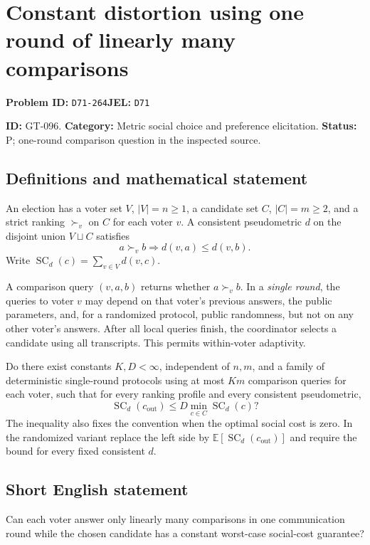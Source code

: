 \documentclass[11pt,a4paper]{article}
\begin{document}
\section*{Constant distortion using one round of linearly many comparisons}
\textbf{Problem ID:} \texttt{D71-264}\quad \textbf{JEL:} \texttt{D71}\par
\label{problem:OP-0226}
\label{game:GT-096}
{\sffamily\small\color{muted}
\noindent\textbf{ID:} GT-096. \textbf{Category:} Metric social choice and preference elicitation.
\textbf{Status:} P; one-round comparison question in the inspected source.
\par}
\subsection*{Definitions and mathematical statement}
An election has a voter set $V$, $|V|=n\geq1$, a candidate set $C$, $|C|=m\geq2$, and a strict ranking $\succ_v$ on $C$ for each voter $v$. A consistent pseudometric $d$ on the disjoint union $V\sqcup C$ satisfies
\[
 a\succ_v b\Longrightarrow d(v,a)\leq d(v,b).
\]
Write $\operatorname{SC}_d(c)=\sum_{v\in V}d(v,c)$.

A comparison query $(v,a,b)$ returns whether $a\succ_v b$. In a \emph{single round}, the queries to voter $v$ may depend on that voter's previous answers, the public parameters, and, for a randomized protocol, public randomness, but not on any other voter's answers. After all local queries finish, the coordinator selects a candidate using all transcripts. This permits within-voter adaptivity.

Do there exist constants $K,D<\infty$, independent of $n,m$, and a family of deterministic single-round protocols using at most $Km$ comparison queries for each voter, such that for every ranking profile and every consistent pseudometric,
\[
 \operatorname{SC}_d(c_{\mathrm{out}})\leq
              D\min_{c\in C}\operatorname{SC}_d(c)?
\]
The inequality also fixes the convention when the optimal social cost is zero. In the randomized variant replace the left side by
$\mathbb E[\operatorname{SC}_d(c_{\mathrm{out}})]$ and require the bound for every fixed consistent $d$.

\subsection*{Short English statement}
Can each voter answer only linearly many comparisons in one communication round while the chosen candidate has a constant worst-case social-cost guarantee?
\end{document}
